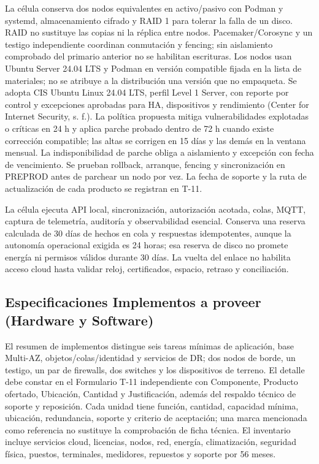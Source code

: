 \documentclass[11pt,letterpaper]{report}
\begin{document}
La célula conserva dos nodos equivalentes en activo/pasivo con Podman y systemd, almacenamiento cifrado y RAID 1 para tolerar la falla de un disco. RAID no sustituye las copias ni la réplica entre nodos. Pacemaker/Corosync y un testigo independiente coordinan conmutación y fencing; sin aislamiento comprobado del primario anterior no se habilitan escrituras. Los nodos usan Ubuntu Server 24.04 LTS y Podman en versión compatible fijada en la lista de materiales; no se atribuye a la distribución una versión que no empaqueta. Se adopta CIS Ubuntu Linux 24.04 LTS, perfil Level 1 Server, con reporte por control y excepciones aprobadas para HA, dispositivos y rendimiento (Center for Internet Security, s. f.). La política propuesta mitiga vulnerabilidades explotadas o críticas en 24 h y aplica parche probado dentro de 72 h cuando existe corrección compatible; las altas se corrigen en 15 días y las demás en la ventana mensual. La indisponibilidad de parche obliga a aislamiento y excepción con fecha de vencimiento. Se prueban rollback, arranque, fencing y sincronización en PREPROD antes de parchear un nodo por vez. La fecha de soporte y la ruta de actualización de cada producto se registran en T-11.

La célula ejecuta API local, sincronización, autorización acotada, colas, MQTT, captura de telemetría, auditoría y observabilidad esencial. Conserva una reserva calculada de 30 días de hechos en cola y respuestas idempotentes, aunque la autonomía operacional exigida es 24 horas; esa reserva de disco no promete energía ni permisos válidos durante 30 días. La vuelta del enlace no habilita acceso cloud hasta validar reloj, certificados, espacio, retraso y conciliación.

\subsection{Especificaciones Implementos a proveer (Hardware y Software)}

El resumen de implementos distingue seis tareas mínimas de aplicación, base Multi-AZ, objetos/colas/identidad y servicios de DR; dos nodos de borde, un testigo, un par de firewalls, dos switches y los dispositivos de terreno. El detalle debe constar en el Formulario T-11 independiente con Componente, Producto ofertado, Ubicación, Cantidad y Justificación, además del respaldo técnico de soporte y reposición. Cada unidad tiene función, cantidad, capacidad mínima, ubicación, redundancia, soporte y criterio de aceptación; una marca mencionada como referencia no sustituye la comprobación de ficha técnica. El inventario incluye servicios cloud, licencias, nodos, red, energía, climatización, seguridad física, puestos, terminales, medidores, repuestos y soporte por 56 meses.
\end{document}
